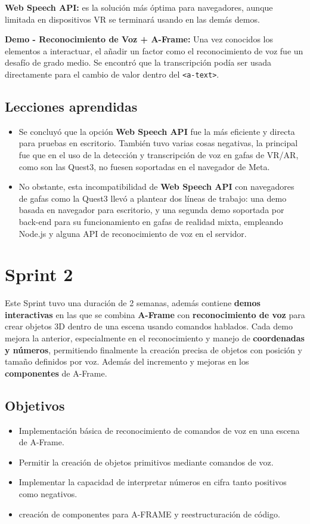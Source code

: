 \documentclass[a4paper, 12pt]{book}
\begin{document}
\textbf{Web Speech API:} es la solución más óptima para navegadores, aunque limitada en dispositivos VR se terminará usando en las demás demos.

\textbf{Demo - Reconocimiento de Voz + A-Frame: }Una vez conocidos los elementos a interactuar, el añadir un factor como el reconocimiento de voz fue un desafío de grado medio. Se encontró que la transcripción podía ser usada directamente para el cambio de valor dentro del \texttt{<a-text>}.

\subsection{Lecciones aprendidas}

\begin{itemize}
 \item Se concluyó que la opción \textbf{Web Speech API} fue la más eficiente y directa para pruebas en escritorio.
 También tuvo varias cosas negativas, la principal fue que en el uso de la detección y transcripción de voz en gafas de VR/AR, como son las Quest3, no fuesen soportadas en el navegador de Meta. 
 \item No obstante, esta incompatibilidad de \textbf{Web Speech API} con navegadores de gafas como la Quest3 llevó a plantear dos líneas de trabajo: una demo basada en navegador para escritorio, y una segunda demo soportada por back-end para su funcionamiento en gafas de realidad mixta, empleando Node.js y alguna API de reconocimiento de voz en el servidor.
\end{itemize}

\clearpage
\section{Sprint 2} 
\label{sec:sprint2}
Este Sprint tuvo una duración de 2 semanas, además contiene \textbf{ demos interactivas} en las que se combina \textbf{A-Frame} con \textbf{reconocimiento de voz} para crear objetos 3D dentro de una escena usando comandos hablados.
Cada demo mejora la anterior, especialmente en el reconocimiento y manejo de \textbf{coordenadas y números}, permitiendo finalmente la creación precisa de objetos con posición y tamaño definidos por voz.
Además del incremento y mejoras en los \textbf{componentes} de A-Frame.

\subsection{Objetivos}
\begin{itemize}
  \item Implementación básica de reconocimiento de comandos de voz en una escena de A-Frame.
  \item Permitir la creación de objetos primitivos mediante comandos de voz.
  \item Implementar la capacidad de interpretar números en cifra tanto positivos como negativos.
  \item creación de componentes para A-FRAME y reestructuración de código.
\end{itemize}
\end{document}
